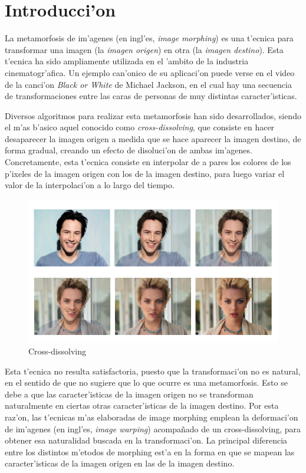 \section{Introducci'on}

La metamorfosis de im'agenes (en ingl'es, \textit{image morphing}) es una t'ecnica para transformar una imagen (la \textit{imagen origen}) en otra (la \textit{imagen destino}). Esta t'ecnica ha sido ampliamente utilizada en el 'ambito de la industria cinematogr'afica. Un ejemplo can'onico de su aplicaci'on puede verse en el video de la canci'on \textit{Black or White} de Michael Jackson, en el cual hay una secuencia de transformaciones entre las caras de personas de muy distintas caracter'isticas.

Diversos algoritmos para realizar esta metamorfosis han sido desarrollados, siendo el m'as b'asico aquel conocido como \textit{cross-dissolving}, que consiste en hacer desaparecer la imagen origen a medida que se hace aparecer la imagen destino, de forma gradual, creando un efecto de disoluci'on de ambas im'agenes. Concretamente, esta t'ecnica consiste en interpolar de a pares los colores de los p'ixeles de la imagen origen con los de la imagen destino, para luego variar el valor de la interpolaci'on a lo largo del tiempo.

\begin{figure}[H]
	\begin{center}
		\includegraphics[scale=0.65]{imagenes/dissolving.png}
	\end{center}		
	\caption{Cross-dissolving}
	\label{fig1}
\end{figure}

Esta t'ecnica no resulta satisfactoria, puesto que la transformaci'on no es natural, en el sentido de que no sugiere que lo que ocurre es una metamorfosis. Esto se debe a que las caracter'isticas de la imagen origen no se transforman naturalmente en ciertas otras caracter'isticas de la imagen destino. Por esta raz'on, las t'ecnicas m'as elaboradas de image morphing emplean la deformaci'on de im'agenes (en ingl'es, \textit{image warping}) acompa\~{n}ado de un cross-dissolving, para obtener esa naturalidad buscada en la transformaci'on. La principal diferencia entre los distintos m'etodos de morphing est'a en la forma en que se mapean las caracter'isticas de la imagen origen en las de la imagen destino.

